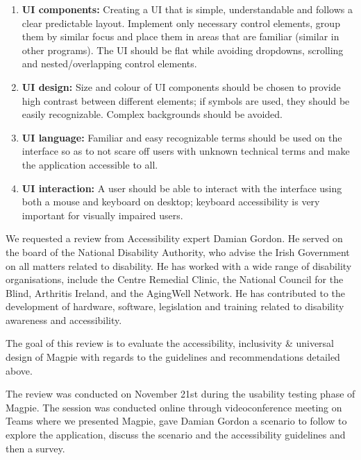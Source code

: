 \begin{enumerate}
    \item\textbf{UI components:} Creating a UI that is simple, understandable
          and follows a clear predictable layout. Implement only necessary control
          elements, group them by similar focus and place them in areas that are
          familiar (similar in other programs). The UI should be flat while avoiding
          dropdowns, scrolling and nested/overlapping control elements.
          \vspace{0.2cm}
          
    \item\textbf{UI design:} Size and colour of UI components should be chosen
          to provide high contrast between different elements; if symbols are used,
          they should be easily recognizable. Complex backgrounds should be avoided.
          
    \item\textbf{UI language:} Familiar and easy recognizable terms should be
          used on the interface so as to not scare off users with unknown technical
          terms and make the application accessible to all.
          \vspace{0.2cm}
          
    \item\textbf{UI interaction:} A user should be able to interact with the
          interface using both a mouse and keyboard on desktop; keyboard accessibility
          is very important for visually impaired users.
\end{enumerate}

We requested a review from Accessibility expert Damian Gordon. He
served on the board of the National Disability Authority, who advise the Irish
Government on all matters related to disability. He has worked with a wide
range of disability organisations, include the Centre Remedial Clinic, the
National Council for the Blind, Arthritis Ireland, and the Aging\-Well Network.
He has contributed to the development of hardware, software, legislation and
training related to disability awareness and accessibility. 

The goal of this review is to evaluate the accessibility, inclusivity \&
universal design of Magpie with regards to the guidelines and recommendations
detailed above.

The review was conducted on November 21st during the usability testing phase of
Magpie. The session was conducted online through videoconference meeting on
Teams where we presented Magpie, gave Damian Gordon a scenario to follow to
explore the application, discuss the scenario and the accessibility guidelines
and then a survey.


